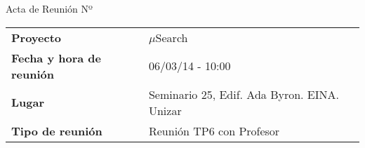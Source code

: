 \begin{center}	
\Large{Acta de Reunión Nº \numeroDeReunion
\newline\tituloReunion}
\end{center}
\vspace{1.5em}

\begin{longtable}{ | L{\tabcolsep} |
				     L{\tabcolsep} | }
\hline %
  \\
\hline %
{\bf Proyecto} & $\mu$Search \\
\hline %
{\bf Fecha y hora de reunión} & 06/03/14 - 10:00 \\
\hline %
{\bf Lugar} & Seminario 25, Edif. Ada Byron. EINA. Unizar \\
\hline %
{\bf Tipo de reunión} & Reunión TP6 con Profesor \\
\hline %
\end{longtable}


